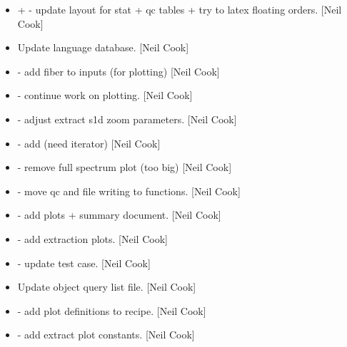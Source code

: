 \documentclass[a4paper,10pt,english]{report}
\begin{document}
\label{\detokenize{misc/changelog:id50}}\begin{itemize}
\item {} 
 +  - update layout for stat + qc tables + try
to latex floating orders. {[}Neil Cook{]}

\item {} 
Update language database. {[}Neil Cook{]}

\item {} 
 - add fiber to  inputs (for
plotting) {[}Neil Cook{]}

\item {} 
 - continue work on plotting. {[}Neil Cook{]}

\item {} 
 - adjust extract s1d zoom
parameters. {[}Neil Cook{]}

\item {} 
 - add  (need iterator)
{[}Neil Cook{]}

\item {} 
 - remove full spectrum plot (too big) {[}Neil
Cook{]}

\item {} 
 - move qc and file writing to functions.
{[}Neil Cook{]}

\item {} 
 - add plots + summary document. {[}Neil Cook{]}

\item {} 
 - add extraction plots. {[}Neil Cook{]}

\item {} 
 - update test case. {[}Neil Cook{]}

\item {} 
Update object query list file. {[}Neil Cook{]}

\item {} 
 - add plot definitions
to recipe. {[}Neil Cook{]}

\item {} 
 - add extract plot constants.
{[}Neil Cook{]}


\end{itemize}
\end{document}

